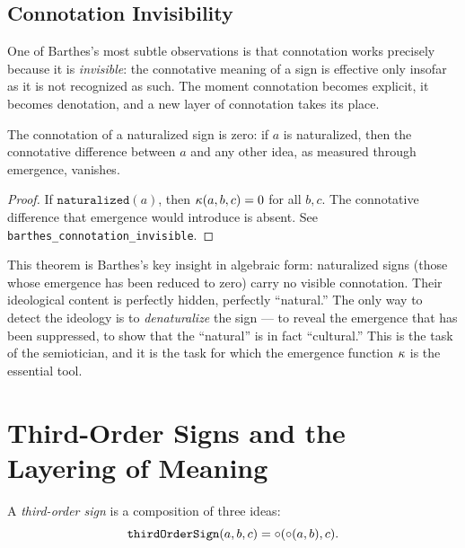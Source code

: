 \subsection{Connotation Invisibility}

One of Barthes's most subtle observations is that connotation works
precisely because it is \emph{invisible}: the connotative meaning of a
sign is effective only insofar as it is not recognized as such. The
moment connotation becomes explicit, it becomes denotation, and a new
layer of connotation takes its place.

\begin{theorem}
\label{thm:connotation-invisible}
The connotation of a naturalized sign is zero: if $a$ is
naturalized, then the connotative difference between $a$ and any
other idea, as measured through emergence, vanishes.
\end{theorem}

\begin{proof}
If $\texttt{naturalized}(a)$, then $\kappa(a, b, c) = 0$ for all
$b, c$. The connotative difference that emergence would introduce is
absent. See \texttt{barthes\_connotation\_invisible}.
\end{proof}

\begin{interpretation}
This theorem is Barthes's key insight in algebraic form: naturalized
signs (those whose emergence has been reduced to zero) carry no visible
connotation. Their ideological content is perfectly hidden, perfectly
``natural.'' The only way to detect the ideology is to
\emph{denaturalize} the sign --- to reveal the emergence that has been
suppressed, to show that the ``natural'' is in fact ``cultural.'' This
is the task of the semiotician, and it is the task for which the
emergence function $\kappa$ is the essential tool.
\end{interpretation}

\section{Third-Order Signs and the Layering of Meaning}

\begin{definition}
\label{def:third-order}
A \emph{third-order sign} is a composition of three ideas:
\[
  \texttt{thirdOrderSign}(a, b, c) = \circ(\circ(a, b), c).
\]
\end{definition}

